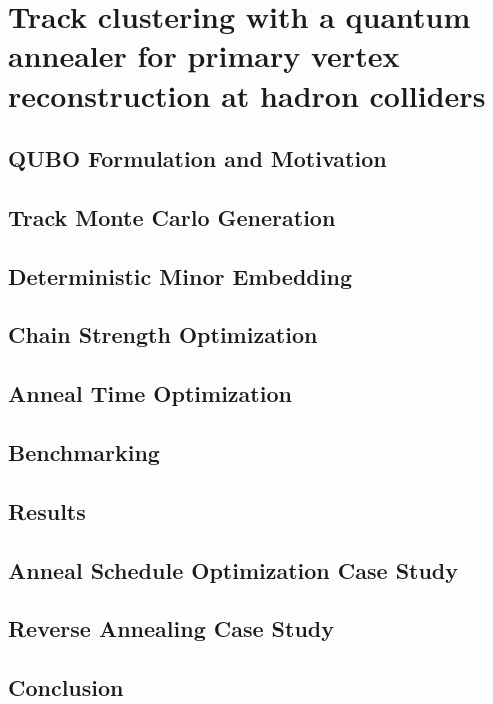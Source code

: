 
\chapter{Track clustering with a quantum annealer for primary vertex reconstruction at hadron colliders}
\label{ch:PrimaryVertexing}

\section{QUBO Formulation and Motivation}

\section{Track Monte Carlo Generation}

\section{Deterministic Minor Embedding}

\section{Chain Strength Optimization}

\section{Anneal Time Optimization}

\section{Benchmarking}

\section{Results}

\section{Anneal Schedule Optimization Case Study}

\section{Reverse Annealing Case Study}

\section{Conclusion}